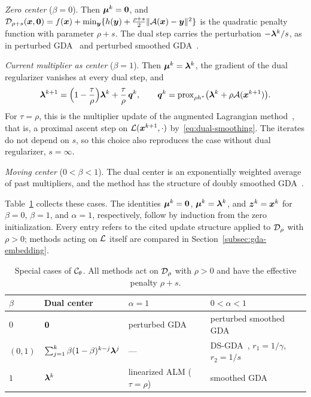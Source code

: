 \emph{Zero center} (\(\beta=0\)). Then \(\bm{\mu}^k=\bm{0}\), and
\(\mathcal{D}_{\rho+s}(\bm{x},\bm{0})=f(\bm{x})+\min_{\bm{y}}\{h(\bm{y})
+\frac{\rho+s}{2}\|\mathcal{A}(\bm{x})-\bm{y}\|^2\}\) is the quadratic penalty function
with parameter \(\rho+s\). The dual step carries the perturbation
\(-\bm{\lambda}^k/s\), as in perturbed GDA~\cite{lu2020hybrid,xu2023unified} and
perturbed smoothed GDA~\cite{li2026smoothing}.

\emph{Current multiplier as center} (\(\beta=1\)). Then
\(\bm{\mu}^k=\bm{\lambda}^k\), the gradient of the dual regularizer vanishes at every
dual step, and
\[
    \bm{\lambda}^{k+1}=\Bigl(1-\frac{\tau}{\rho}\Bigr)\bm{\lambda}^k+\frac{\tau}{\rho}\,\bm{q}^k,
    \qquad
    \bm{q}^k=\mathrm{prox}_{\rho h^*}\bigl(\bm{\lambda}^k+\rho\mathcal{A}(\bm{x}^{k+1})\bigr).
\]
For \(\tau=\rho\), this is the multiplier update of the augmented Lagrangian
method~\cite{hestenes1969multiplier,powell1969method,rockafellar1973multiplier},
that is, a proximal ascent step on \(\mathcal{L}(\bm{x}^{k+1},\cdot)\)
by~\eqref{eq:dual-smoothing}. The iterates do not depend on \(s\), so this
choice also reproduces the case without dual regularizer, \(s=\infty\).

\emph{Moving center} (\(0<\beta<1\)). The dual center is an exponentially
weighted average of past multipliers, and the method has the structure of doubly smoothed
GDA~\cite{zheng2023universal}.

Table~\ref{tab:special-cases} collects these cases. The identities
\(\bm{\mu}^k=\bm{0}\), \(\bm{\mu}^k=\bm{\lambda}^k\), and \(\bm{z}^k=\bm{x}^k\) for
\(\beta=0\), \(\beta=1\), and \(\alpha=1\), respectively, follow by induction
from the zero initialization. Every entry refers to the cited update structure
applied to \(\mathcal{D}_\rho\) with \(\rho>0\); methods acting on \(\mathcal{L}\) itself
are compared in Section~\ref{subsec:gda-embedding}.

\begin{table}[t]
\centering
\small
\caption{Special cases of \(\mathcal{C}_\theta\). All methods act on
\(\mathcal{D}_\rho\) with \(\rho>0\) and have the effective penalty \(\rho+s\).}
\label{tab:special-cases}
\begin{tabular}{@{}llll@{}}
\toprule
\(\beta\) & Dual center & \(\alpha=1\) & \(0<\alpha<1\) \\
\midrule
\(0\) & \(\bm{0}\)
  & perturbed GDA~\cite{lu2020hybrid,xu2023unified}
  & perturbed smoothed GDA~\cite{li2026smoothing} \\
\((0,1)\) & \(\sum_{j=1}^{k}\beta(1-\beta)^{k-j}\bm{\lambda}^j\)
  & ---
  & DS-GDA~\cite{zheng2023universal}, \(r_1=1/\gamma\), \(r_2=1/s\) \\
\(1\) & \(\bm{\lambda}^k\)
  & linearized ALM (\(\tau=\rho\))
  & smoothed GDA~\cite{zhang2020smoothed} \\
\bottomrule
\end{tabular}
\end{table}

